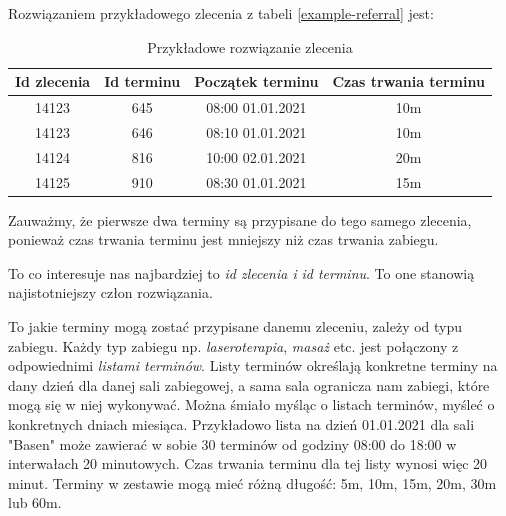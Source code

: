 Rozwiązaniem przykładowego zlecenia z tabeli \ref{example-referral}
jest:

\begin{table}[h]
	\centering
	\begin{tabular}{ | c | c | c | c | }
		\hline
	\bfseries Id zlecenia & \bfseries Id terminu & \bfseries Początek terminu & \bfseries Czas trwania terminu \\
	\hline
	14123 & 645 & 08:00 01.01.2021 & 10m \\
	\hline
	14123 & 646 & 08:10 01.01.2021 & 10m \\
	\hline
	14124 & 816 & 10:00 02.01.2021 & 20m \\
	\hline
	14125 & 910 & 08:30 01.01.2021 & 15m \\
	\hline
	\end{tabular}
	\caption{Przykładowe rozwiązanie zlecenia}
	\label{example-solution}
\end{table}

Zauważmy, że pierwsze dwa terminy są przypisane do tego samego zlecenia,
ponieważ czas trwania terminu jest mniejszy niż czas trwania zabiegu.

To co interesuje nas najbardziej to \emph{id zlecenia i} \emph{id terminu}. To
one stanowią najistotniejszy człon rozwiązania.

To jakie terminy mogą zostać przypisane danemu zleceniu,
zależy od typu zabiegu. Każdy typ zabiegu np. \emph{laseroterapia}, \emph{masaż} etc. jest
połączony z odpowiednimi \emph{listami terminów}. Listy terminów określają
konkretne terminy na dany dzień dla danej sali zabiegowej, a sama sala
ogranicza nam zabiegi, które mogą się w niej wykonywać. Można śmiało myśląc o
listach terminów, myśleć o konkretnych dniach miesiąca. Przykładowo lista na
dzień 01.01.2021 dla sali "Basen" może zawierać w sobie 30 terminów od godziny 08:00
do 18:00 w interwałach 20 minutowych. Czas trwania terminu dla tej listy wynosi
więc 20 minut. Terminy w zestawie mogą mieć różną długość: 5m, 10m, 15m, 20m, 30m
lub 60m. %

